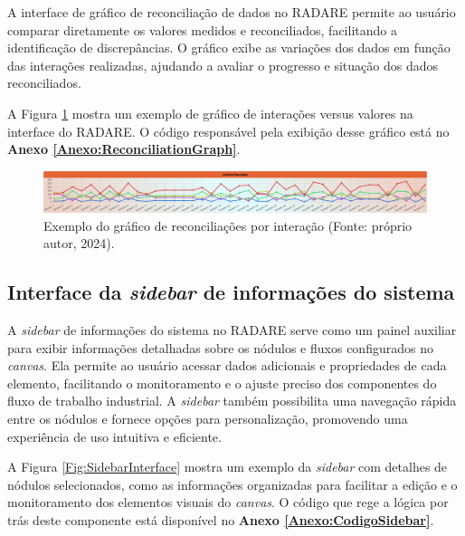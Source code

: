 A interface de gráfico de reconciliação de dados no RADARE permite ao usuário comparar diretamente os valores medidos e reconciliados, facilitando a identificação de discrepâncias. O gráfico exibe as variações dos dados em função das interações realizadas, ajudando a avaliar o progresso e situação dos dados reconciliados.

A Figura \ref{Fig:ReconciliationGraph} mostra um exemplo de gráfico de interações versus valores na interface do RADARE. O código responsável pela exibição desse gráfico está no \textbf{Anexo \ref{Anexo:ReconciliationGraph}}.

\begin{figure}[htbp]
    \centering
    \includegraphics[width=1\textwidth]{figuras/interface-grafico.png}
    \caption{Exemplo do gráfico de reconciliações por interação (Fonte: próprio autor, 2024).}
    \label{Fig:ReconciliationGraph}
\end{figure}

\subsection{Interface da \textit{sidebar} de informações do sistema}

A \textit{sidebar} de informações do sistema no RADARE serve como um painel auxiliar para exibir informações detalhadas sobre os nódulos e fluxos configurados no \textit{canvas}. Ela permite ao usuário acessar dados adicionais e propriedades de cada elemento, facilitando o monitoramento e o ajuste preciso dos componentes do fluxo de trabalho industrial. A \textit{sidebar} também possibilita uma navegação rápida entre os nódulos e fornece opções para personalização, promovendo uma experiência de uso intuitiva e eficiente.

A Figura \ref{Fig:SidebarInterface} mostra um exemplo da \textit{sidebar} com detalhes de nódulos selecionados, como as informações organizadas para facilitar a edição e o monitoramento dos elementos visuais do \textit{canvas}. O código que rege a lógica por trás deste componente está disponível no \textbf{Anexo \ref{Anexo:CodigoSidebar}}.

